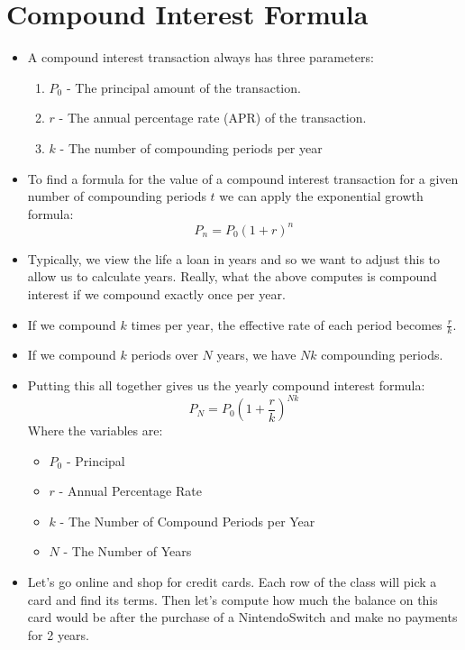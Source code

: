 \documentclass{article}
\begin{document}
\section{Compound Interest Formula}
\begin{itemize}
    \item A compound interest transaction always has three parameters:
    \begin{enumerate} 
        \item $P_0$ - The principal amount of the transaction.
        \item $r$ - The annual percentage rate (APR) of the
            transaction.
        \item $k$ - The number of compounding periods per year
    \end{enumerate}

    \item To find a formula for the value of a compound interest
        transaction for a given number of compounding periods $t$ we 
        can apply the exponential growth formula:
        \[
            P_n = P_0(1+r)^n
        \]
    \item Typically, we view the life a loan in years and so we want
        to adjust this to allow us to calculate years.  Really, what
        the above computes is compound interest if we compound exactly
        once per year.  
    \item If we compound $k$ times per year, the effective rate of
        each period becomes $\frac{r}{k}$.
    \item If we compound $k$ periods over $N$ years, we have $Nk$
        compounding periods.
    \item Putting this all together gives us the yearly compound
        interest formula:
        \[
            P_N = P_0\left(1+\displaystyle\frac{r}{k}\right)^{Nk}
        \]
        Where the variables are:
        \begin{itemize}
            \item $P_0$ - Principal
            \item $r$ - Annual Percentage Rate
            \item $k$ - The Number of Compound Periods per Year
            \item $N$ - The Number of Years
        \end{itemize}
    \item Let's go online and shop for credit cards.  Each row of the
        class will pick a card and find its terms.  Then let's compute how
        much the balance on this card would be after the purchase of
        a Nintendo\texttrademark Switch and make no payments for 2 years.
\end{itemize}
\end{document}
